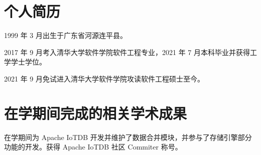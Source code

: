 
\begin{resume}

  \section*{个人简历}
  1999 年 3 月出生于广东省河源连平县。

  2017 年 9 月考入清华大学软件学院软件工程专业，2021 年 7 月本科毕业并获得工学学士学位。

  2021 年 9 月免试进入清华大学软件学院攻读软件工程硕士至今。

  \section*{在学期间完成的相关学术成果}
  在学期间为 Apache IoTDB 开发并维护了数据合并模块，并参与了存储引擎部分功能的开发。获得 Apache IoTDB 社区 Commiter 称号。

\end{resume}
